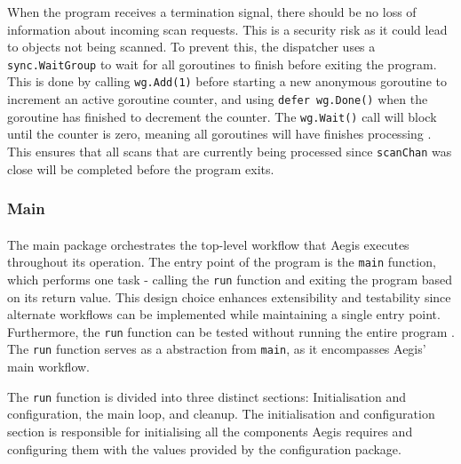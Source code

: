 \documentclass[12pt, conference, final, a4paper, onecolumn, compsoc]{IEEEtran}
\begin{document}
When the program receives a termination signal, there should be no loss of
information about incoming scan requests. This is a security risk as it could
lead to objects not being scanned. To prevent this, the dispatcher uses a
\texttt{sync.WaitGroup} to wait for all goroutines to finish before exiting the
program. This is done by calling \texttt{wg.Add(1)} before starting a new
anonymous goroutine to increment an active goroutine counter, and using
\texttt{defer wg.Done()} when the goroutine has finished to decrement the
counter. The \texttt{wg.Wait()} call will block until the counter is zero,
meaning all goroutines will have finishes processing \citep{go-waitgroups}. This
ensures that all scans that are currently being processed since
\texttt{scanChan} was close will be completed before the program exits.

\subsubsection*{Main}
\paragraph{}


The main package orchestrates the top-level workflow that Aegis executes
throughout its operation. The entry point of the program is the \texttt{main}
function, which performs one task - calling the \texttt{run} function and
exiting the program based on its return value. This design choice enhances
extensibility and testability since alternate workflows can be implemented while
maintaining a single entry point. Furthermore, the \texttt{run} function can be
tested without running the entire program \citep{go-tiny-abstraction}. The
\texttt{run} function serves as a abstraction from \texttt{main}, as it
encompasses Aegis' main workflow.

The \texttt{run} function is divided into three distinct sections:
Initialisation and configuration, the main loop, and cleanup. The initialisation
and configuration section is responsible for initialising all the components
Aegis requires and configuring them with the values provided by the
configuration package.
\end{document}
